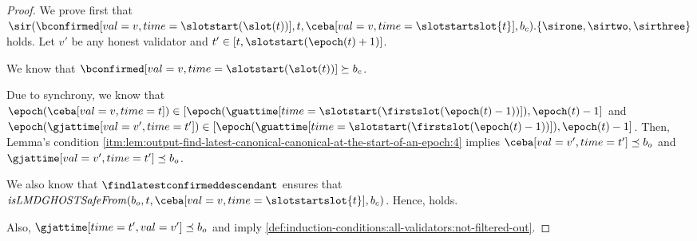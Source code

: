 \documentclass{article}
\begin{document}
\begin{proof}
        We prove first that $\sir(\bconfirmed[val=v,time=\slotstart(\slot(t))],t,\ceba[val=v,time=\slotstartslot{t}],b_c).\{ \sirone, \sirtwo, \sirthree\}$ holds.
        Let $v'$ be any honest validator and $t' \in [t, \slotstart(\epoch(t)+1)]$.





        We know that $\bconfirmed[val=v,time=\slotstart(\slot(t))] \succeq b_c$.

        Due to synchrony, we know that $\epoch(\ceba[val=v,time=t]) \in [\epoch(\guattime[time=\slotstart(\firstslot(\epoch(t)-1))]),\epoch(t)-1]$ and $\epoch(\gjattime[val=v',time=t']) \in [\epoch(\guattime[time=\slotstart(\firstslot(\epoch(t)-1))]),\epoch(t)-1]$.
        Then, Lemma's condition \ref{itm:lem:output-find-latest-canonical-canonical-at-the-start-of-an-epoch:4} implies $\ceba[val=v',time=t'] \preceq b_o$ and $\gjattime[val=v',time=t'] \preceq b_o$.




        We also know that $\findlatestconfirmeddescendant$ ensures that\\
            $\mathit{isLMDGHOSTSafeFrom}(b_o,t,\ceba[val=v,time=\slotstartslot{t}],b_c)$. 
        Hence, \sirone holds.


        Also, $\gjattime[time=t',val=v'] \preceq b_o$ and
         imply \ref{def:induction-conditions:all-validators:not-filtered-out}.


\end{proof}
\end{document}
